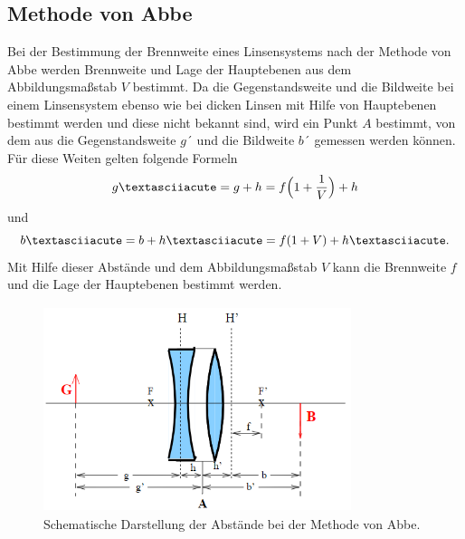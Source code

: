 \subsection{Methode von Abbe}
Bei der Bestimmung der Brennweite eines Linsensystems nach der Methode von Abbe
werden Brennweite und Lage der Hauptebenen aus dem Abbildungsmaßstab $V$ bestimmt.
Da die Gegenstandsweite und die Bildweite bei einem Linsensystem ebenso wie bei
dicken Linsen mit Hilfe von Hauptebenen bestimmt werden und diese nicht bekannt sind,
wird ein Punkt $A$ bestimmt, von dem aus die Gegenstandsweite $g´$ und die Bildweite $b´$
gemessen werden können. Für diese Weiten gelten folgende Formeln
\begin{equation}
   g´=g+h=f \Bigl(1+\frac{1}{V} \Bigr)+h\\
\end{equation}
\noindent und
\begin{equation}
b´=b+h´=f(1+V)+h´.\\
\end{equation}
\noindent
Mit Hilfe dieser Abstände und dem Abbildungsmaßstab $V$ kann die Brennweite $f$ und die
Lage der Hauptebenen bestimmt werden.
\begin{figure}[H]
   \begin{center}
   \includegraphics[width = 9cm, height= 6cm]{Abbe.png}
   \caption{Schematische Darstellung der Abstände bei der Methode von Abbe.\protect\cite{AL}}
   \end{center}
   \label{fig:Abbe}
   \end{figure}
   \noindent
